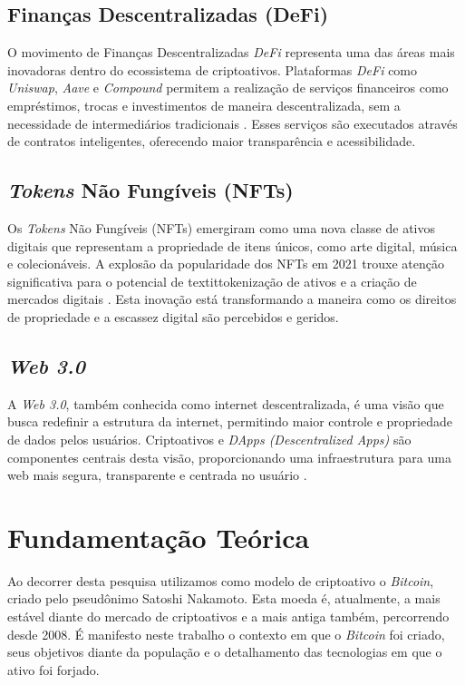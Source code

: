 \section*{Finanças Descentralizadas (DeFi)}

O movimento de Finanças Descentralizadas \textit{DeFi} representa uma das áreas mais inovadoras dentro do ecossistema de criptoativos. Plataformas \textit{DeFi} como \textit{Uniswap}, \textit{Aave} e \textit{Compound} permitem a realização de serviços financeiros como empréstimos, trocas e investimentos de maneira descentralizada, sem a necessidade de intermediários tradicionais \cite{zhang2020data}. Esses serviços são executados através de contratos inteligentes, oferecendo maior transparência e acessibilidade.

\section*{\textit{Tokens} Não Fungíveis (NFTs)}

Os \textit{Tokens} Não Fungíveis (NFTs) emergiram como uma nova classe de ativos digitais que representam a propriedade de itens únicos, como arte digital, música e colecionáveis. A explosão da popularidade dos NFTs em 2021 trouxe atenção significativa para o potencial de textit{tokenização} de ativos e a criação de mercados digitais \cite{wang2021non}. Esta inovação está transformando a maneira como os direitos de propriedade e a escassez digital são percebidos e geridos.

\section*{\textit{Web 3.0}}

A \textit{Web 3.0}, também conhecida como internet descentralizada, é uma visão que busca redefinir a estrutura da internet, permitindo maior controle e propriedade de dados pelos usuários. Criptoativos e \textit{DApps (Descentralized Apps)} são componentes centrais desta visão, proporcionando uma infraestrutura para uma web mais segura, transparente e centrada no usuário \cite{zhang2019secure}.


\chapter{Fundamentação Teórica}
Ao decorrer desta pesquisa utilizamos como modelo de criptoativo o \textit{Bitcoin}, criado pelo pseudônimo Satoshi Nakamoto. Esta moeda é, atualmente, a mais estável diante do mercado de criptoativos e a mais antiga também, percorrendo desde 2008. É manifesto neste trabalho o contexto em que o \textit{Bitcoin} foi criado, seus objetivos diante da população e o detalhamento das tecnologias em que o ativo foi forjado.

